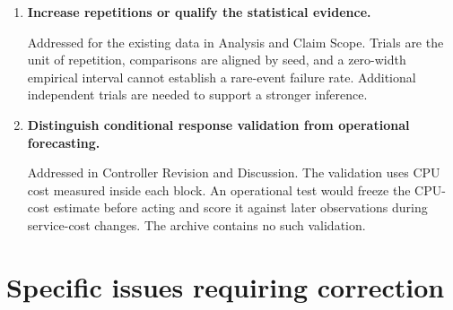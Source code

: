 \documentclass[10pt,a4paper]{article}
\newcommand{\reply}[2]{\item \textbf{#1}\par\noindent #2}
\begin{document}
\begin{enumerate}
\reply{Increase repetitions or qualify the statistical evidence.}{Addressed for the existing data in Analysis and Claim Scope. Trials are the unit of repetition, comparisons are aligned by seed, and a zero-width empirical interval cannot establish a rare-event failure rate. Additional independent trials are needed to support a stronger inference.}
\reply{Distinguish conditional response validation from operational forecasting.}{Addressed in Controller Revision and Discussion. The validation uses CPU cost measured inside each block. An operational test would freeze the CPU-cost estimate before acting and score it against later observations during service-cost changes. The archive contains no such validation.}
\end{enumerate}

\section*{Specific issues requiring correction}
\end{document}

